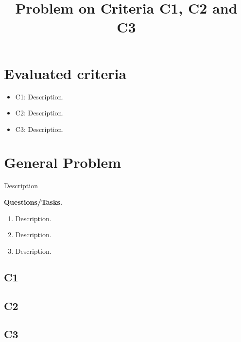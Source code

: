 \makeatletter
{}
\makeatother	



\title{Problem on Criteria C1, C2 and C3}
\author{}
\date{}


	
	\maketitle

	\setcounter{tocdepth}{1}
	\setcounter{secnumdepth}{2}
	\tableofcontents

	\section*{Evaluated criteria}
	\begin{itemize}
		\item C1: Description.
		\item C2: Description.
		\item C3: Description.
	\end{itemize}
	
	\section*{General Problem}
	Description 
	
	\textbf{Questions/Tasks.}
	\begin{enumerate}[label=\textbf{\alph*)}]
		\item[(C1)] Description.
		\item[(C2)] Description.
		\item[(C3)] Description.
	\end{enumerate}
	
	\subsection*{C1}
	
	\subsection*{C2}
	
	\subsection*{C3}
	
